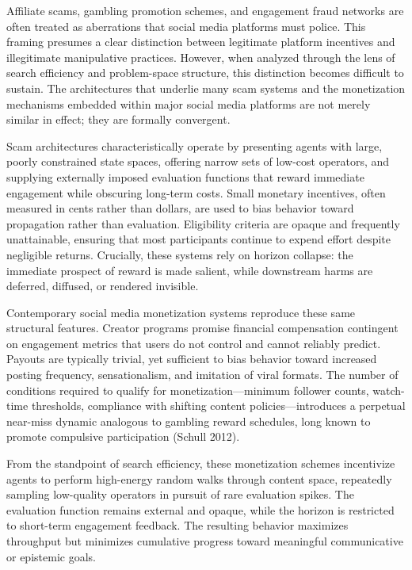 \documentclass[12pt]{article}
\begin{document}
Affiliate scams, gambling promotion schemes, and engagement fraud networks are often treated as aberrations that social media platforms must police. This framing presumes a clear distinction between legitimate platform incentives and illegitimate manipulative practices. However, when analyzed through the lens of search efficiency and problem-space structure, this distinction becomes difficult to sustain. The architectures that underlie many scam systems and the monetization mechanisms embedded within major social media platforms are not merely similar in effect; they are formally convergent.

Scam architectures characteristically operate by presenting agents with large, poorly constrained state spaces, offering narrow sets of low-cost operators, and supplying externally imposed evaluation functions that reward immediate engagement while obscuring long-term costs. Small monetary incentives, often measured in cents rather than dollars, are used to bias behavior toward propagation rather than evaluation. Eligibility criteria are opaque and frequently unattainable, ensuring that most participants continue to expend effort despite negligible returns. Crucially, these systems rely on horizon collapse: the immediate prospect of reward is made salient, while downstream harms are deferred, diffused, or rendered invisible.

Contemporary social media monetization systems reproduce these same structural features. Creator programs promise financial compensation contingent on engagement metrics that users do not control and cannot reliably predict. Payouts are typically trivial, yet sufficient to bias behavior toward increased posting frequency, sensationalism, and imitation of viral formats. The number of conditions required to qualify for monetization—minimum follower counts, watch-time thresholds, compliance with shifting content policies—introduces a perpetual near-miss dynamic analogous to gambling reward schedules, long known to promote compulsive participation (Schull 2012).

From the standpoint of search efficiency, these monetization schemes incentivize agents to perform high-energy random walks through content space, repeatedly sampling low-quality operators in pursuit of rare evaluation spikes. The evaluation function remains external and opaque, while the horizon is restricted to short-term engagement feedback. The resulting behavior maximizes throughput but minimizes cumulative progress toward meaningful communicative or epistemic goals.
\end{document}
